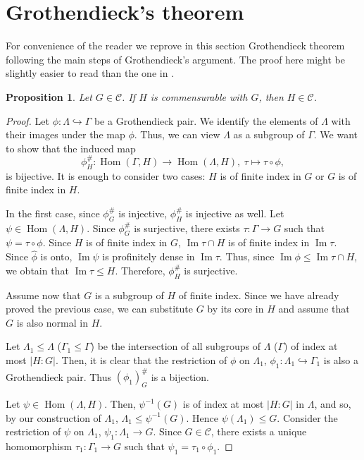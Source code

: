 \documentclass{amsart}
\newtheorem{pro}[lem]{Proposition}
\theoremstyle{definition}
\theoremstyle{remark}
\DeclareMathOperator{\im}{Im}
\DeclareMathOperator{\Hom}{Hom}
\begin{document}
  \section{Grothendieck's theorem}\label{GLRsection}
  For convenience of the reader we reprove in this section  Grothendieck theorem following the main steps of Grothendieck's argument. The proof here might be slightly easier to read than the one in \cite{Gr70}.
   \begin{pro}\label{gr1}
Let $G\in \mathcal C$. If $H$ is commensurable with $G$, then $H\in \mathcal C$.
\end{pro}
\begin{proof}
Let  $\phi:\Lambda \hookrightarrow \Gamma$ be a Grothendieck pair. We identify the elements of $\Lambda$ with their images under the map $\phi$. Thus, we can view $\Lambda$ as a subgroup of $\Gamma$.
 We want to show that the induced map 
$$ \phi^{\#}_H:\Hom (\Gamma, H)\to \Hom (\Lambda, H), \ \tau\mapsto \tau\circ \phi,$$  is bijective. It is enough to consider two cases: $H$ is of finite index in $G$ or $G$ is of finite index in $H$.

In the first case, since $\phi_G^{\#}$ is injective,  $\phi_H^{\#}$ is injective as well. Let $\psi\in \Hom (\Lambda, H)$. Since $\phi_G^{\#}$ is surjective, there exists $\tau: \Gamma\to G$ such that $\psi=\tau\circ \phi$. Since $H$ is of finite index in $G$, $\im \tau \cap H$ is of finite index in $\im \tau$. Since $\widehat \phi$ is onto, $\im \psi$ is profinitely dense in $\im \tau$. Thus, since $\im \phi\le \im \tau \cap H$,  we obtain that
$\im \tau\le H$. Therefore, $\phi_H^{\#}$ is surjective.

Assume now that $G$ is a subgroup of $H$ of finite index. Since we have already proved the previous case, we can substitute $G$ by its core in $H$ and  assume that $G$ is also normal in $H$.

Let $\Lambda_1\le \Lambda $ ($\Gamma_1\le \Gamma$) be the intersection of all subgroups of $\Lambda$ ($\Gamma$) of index at most $|H:G|$. Then, it is clear that the restriction of $\phi$ on $\Lambda_1$, $\phi_1:\Lambda_1 \hookrightarrow \Gamma_1$ is also a Grothendieck pair. Thus $(\phi_1)_G^{\#}$ is a bijection. 

Let $\psi\in \Hom(\Lambda, H)$. Then, $\psi^{-1}(G)$ is of index at most $|H:G|$ in $\Lambda$, and so,   by our construction of $\Lambda_1$, $\Lambda_1\le \psi^{-1}(G)$. Hence $\psi(\Lambda_1)\le G$.  Consider the restriction of $\psi$ on $\Lambda_1$, $\psi_1:\Lambda_1 \to  G$.  Since $G\in \mathcal C$, there exists a unique homomorphism $\tau_1:\Gamma_1\to G$ such that $\psi_1=\tau_1\circ \phi_1$.  


\end{proof}
\end{document}
